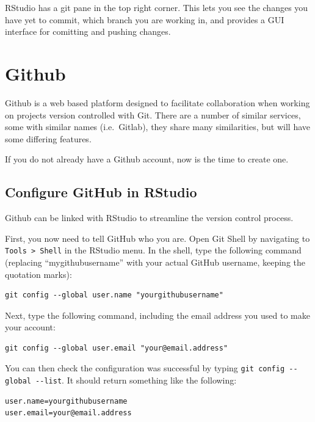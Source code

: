 \documentclass[
  letterpaper,
]{book}
\begin{document}
\begin{tcolorbox}
RStudio has a git pane in the top right corner. This lets you see the
changes you have yet to commit, which branch you are working in, and
provides a GUI interface for comitting and pushing changes.

\hypertarget{github}{%
\section{Github}\label{github}}

Github is a web based platform designed to facilitate collaboration when
working on projects version controlled with Git. There are a number of
similar services, some with similar names (i.e.~Gitlab), they share many
similarities, but will have some differing features.

If you do not already have a Github account, now is the time to create
one.

\hypertarget{configure-github-in-rstudio}{%
\subsection{Configure GitHub in
RStudio}\label{configure-github-in-rstudio}}

Github can be linked with RStudio to streamline the version control
process.

First, you now need to tell GitHub who you are. Open Git Shell by
navigating to \texttt{Tools\ \textgreater{}\ Shell} in the RStudio menu.
In the shell, type the following command (replacing ``mygithubusername''
with your actual GitHub username, keeping the quotation marks):

\begin{verbatim}
git config --global user.name "yourgithubusername"
\end{verbatim}

Next, type the following command, including the email address you used
to make your account:

\begin{verbatim}
git config --global user.email "your@email.address"
\end{verbatim}

You can then check the configuration was successful by typing
\texttt{git\ config\ -\/-global\ -\/-list}. It should return something
like the following:

\begin{verbatim}
user.name=yourgithubusername
user.email=your@email.address
\end{verbatim}


\end{tcolorbox}
\end{document}
